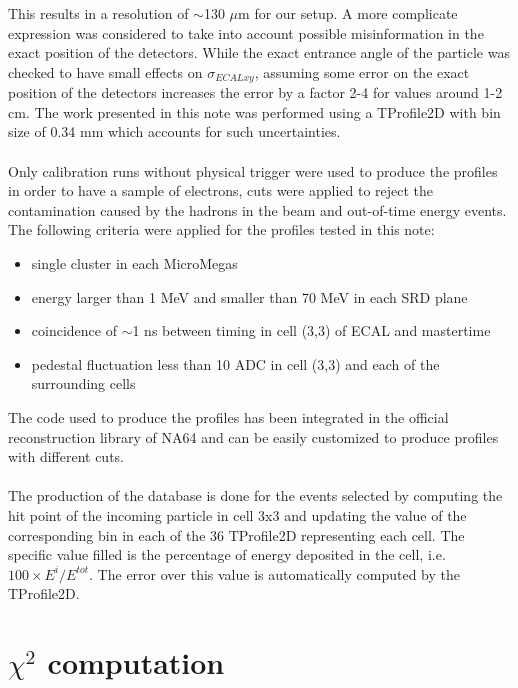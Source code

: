 This results in a resolution of $\sim$130 $\mu$m for our setup. A more
complicate expression was considered to take into account possible
misinformation in the exact position of the detectors. While the exact
entrance angle of the particle was checked to have small effects on
$\sigma_{ECALxy}$, assuming some error on the exact position of the
detectors increases the error by a factor 2-4 for values around 1-2
cm. The work presented in this note was performed using a TProfile2D
with bin size of 0.34 mm which accounts for such uncertainties.
\\
\\
Only calibration runs without physical trigger were used to produce
the profiles in order to have a sample of electrons, cuts were applied
to
reject the contamination caused by the hadrons in the beam and out-of-time energy events. \\
The following criteria were applied for the profiles tested in this
note:

\begin{itemize}
\item single cluster in each MicroMegas
\item energy larger than 1 MeV and smaller than 70 MeV in each SRD
  plane
\item coincidence of $\sim$1 ns between timing in cell (3,3) of ECAL
  and mastertime
\item pedestal fluctuation less than 10 ADC in cell (3,3) and each of
  the surrounding cells
\end{itemize}

The code used to produce the profiles
has been integrated in the official reconstruction library of NA64 and can
be easily customized to produce profiles with different cuts.
\\
\\
The production of the database is done for the events
selected by computing the hit point of the incoming particle in cell
3x3 and updating the value of the corresponding bin in each of the 36
TProfile2D representing each cell. The specific value filled is the
percentage of energy deposited in the cell, i.e. $100 \times E^i/E^{tot}$.
The error over this value is automatically computed by the TProfile2D.
\section{$\chi^2$ computation}
\label{ch3:sec:chi2-comp}

